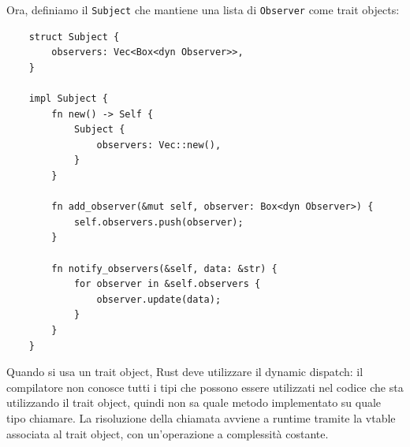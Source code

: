Ora, definiamo il \texttt{Subject} che mantiene una lista di \texttt{Observer} come trait objects:
\begin{verbatim}
    struct Subject {
        observers: Vec<Box<dyn Observer>>,
    }

    impl Subject {
        fn new() -> Self {
            Subject {
                observers: Vec::new(),
            }
        }

        fn add_observer(&mut self, observer: Box<dyn Observer>) {
            self.observers.push(observer);
        }

        fn notify_observers(&self, data: &str) {
            for observer in &self.observers {
                observer.update(data);
            }
        }
    }
\end{verbatim}
Quando si usa un trait object, Rust deve utilizzare il dynamic dispatch: il compilatore non conosce tutti i tipi che possono essere utilizzati nel codice che sta utilizzando il trait object, quindi non sa quale metodo implementato su quale tipo chiamare. La risoluzione della chiamata avviene a runtime tramite la vtable associata al trait object, con un'operazione a complessità costante.
